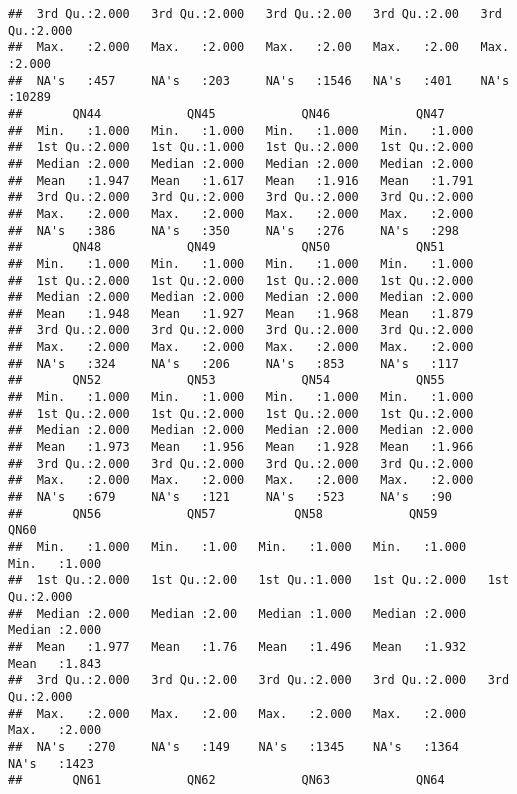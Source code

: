 \documentclass[
]{article}
\begin{document}
\begin{verbatim}
##  3rd Qu.:2.000   3rd Qu.:2.000   3rd Qu.:2.00   3rd Qu.:2.00   3rd Qu.:2.000  
##  Max.   :2.000   Max.   :2.000   Max.   :2.00   Max.   :2.00   Max.   :2.000  
##  NA's   :457     NA's   :203     NA's   :1546   NA's   :401    NA's   :10289  
##       QN44            QN45            QN46            QN47      
##  Min.   :1.000   Min.   :1.000   Min.   :1.000   Min.   :1.000  
##  1st Qu.:2.000   1st Qu.:1.000   1st Qu.:2.000   1st Qu.:2.000  
##  Median :2.000   Median :2.000   Median :2.000   Median :2.000  
##  Mean   :1.947   Mean   :1.617   Mean   :1.916   Mean   :1.791  
##  3rd Qu.:2.000   3rd Qu.:2.000   3rd Qu.:2.000   3rd Qu.:2.000  
##  Max.   :2.000   Max.   :2.000   Max.   :2.000   Max.   :2.000  
##  NA's   :386     NA's   :350     NA's   :276     NA's   :298    
##       QN48            QN49            QN50            QN51      
##  Min.   :1.000   Min.   :1.000   Min.   :1.000   Min.   :1.000  
##  1st Qu.:2.000   1st Qu.:2.000   1st Qu.:2.000   1st Qu.:2.000  
##  Median :2.000   Median :2.000   Median :2.000   Median :2.000  
##  Mean   :1.948   Mean   :1.927   Mean   :1.968   Mean   :1.879  
##  3rd Qu.:2.000   3rd Qu.:2.000   3rd Qu.:2.000   3rd Qu.:2.000  
##  Max.   :2.000   Max.   :2.000   Max.   :2.000   Max.   :2.000  
##  NA's   :324     NA's   :206     NA's   :853     NA's   :117    
##       QN52            QN53            QN54            QN55      
##  Min.   :1.000   Min.   :1.000   Min.   :1.000   Min.   :1.000  
##  1st Qu.:2.000   1st Qu.:2.000   1st Qu.:2.000   1st Qu.:2.000  
##  Median :2.000   Median :2.000   Median :2.000   Median :2.000  
##  Mean   :1.973   Mean   :1.956   Mean   :1.928   Mean   :1.966  
##  3rd Qu.:2.000   3rd Qu.:2.000   3rd Qu.:2.000   3rd Qu.:2.000  
##  Max.   :2.000   Max.   :2.000   Max.   :2.000   Max.   :2.000  
##  NA's   :679     NA's   :121     NA's   :523     NA's   :90     
##       QN56            QN57           QN58            QN59            QN60      
##  Min.   :1.000   Min.   :1.00   Min.   :1.000   Min.   :1.000   Min.   :1.000  
##  1st Qu.:2.000   1st Qu.:2.00   1st Qu.:1.000   1st Qu.:2.000   1st Qu.:2.000  
##  Median :2.000   Median :2.00   Median :1.000   Median :2.000   Median :2.000  
##  Mean   :1.977   Mean   :1.76   Mean   :1.496   Mean   :1.932   Mean   :1.843  
##  3rd Qu.:2.000   3rd Qu.:2.00   3rd Qu.:2.000   3rd Qu.:2.000   3rd Qu.:2.000  
##  Max.   :2.000   Max.   :2.00   Max.   :2.000   Max.   :2.000   Max.   :2.000  
##  NA's   :270     NA's   :149    NA's   :1345    NA's   :1364    NA's   :1423   
##       QN61            QN62            QN63            QN64      

\end{verbatim}
\end{document}
